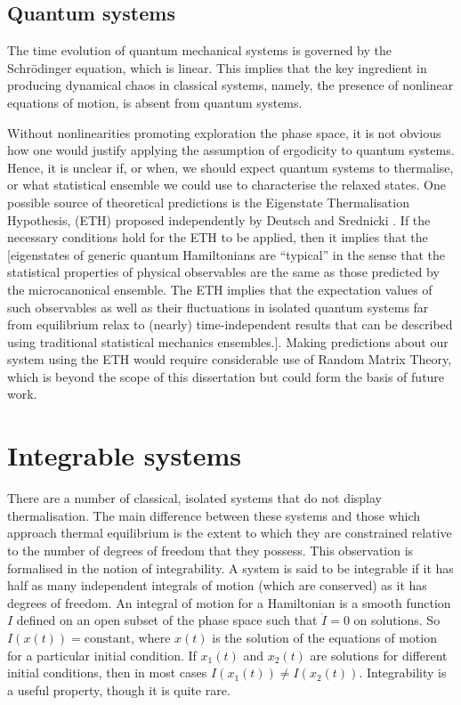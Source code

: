 \documentclass[a4paper, 10pt]{article}
\theoremstyle{plain}
\begin{document}
\subsection{Quantum systems}

The time evolution of quantum mechanical systems is governed by the
Schr\"odinger equation, which is linear. This implies that the key ingredient
in producing dynamical chaos in classical systems, namely, the presence of
nonlinear equations of motion, is absent from quantum systems.

Without nonlinearities promoting exploration the phase space, it is
not obvious how one would justify applying the assumption of ergodicity to
quantum systems. Hence, it is unclear if, or when, we should expect quantum systems to
thermalise, or what statistical ensemble we could use to characterise the
relaxed states. One possible source of theoretical predictions is the
Eigenstate Thermalisation Hypothesis, (ETH) proposed independently by Deutsch
\cite{Deutsch1991} and Srednicki \cite{Srednicki1994}. If the necessary
conditions hold for the ETH to be applied, then it implies that the [eigenstates
of generic quantum Hamiltonians are “typical” in the sense that the statistical
properties of physical observables are the same as those predicted by the
microcanonical ensemble. The ETH implies that the expectation values
of such observables as well as their fluctuations in isolated quantum systems
far from equilibrium relax to (nearly) time-independent results that can be
described using traditional statistical mechanics ensembles.]. Making predictions
about our system using the ETH would require considerable use of Random Matrix
Theory, which is beyond the scope of this dissertation but could form the basis
of future work.

\section{Integrable systems}

There are a number of classical, isolated systems that do not display
thermalisation. The main difference between these systems and those which
approach thermal equilibrium is the extent to which they are constrained
relative to the number of degrees of freedom that they possess. This observation
is formalised in the notion of integrability. A system is said to be integrable
if it has half as many independent integrals of motion (which are conserved)
as it has degrees of freedom. An integral of motion for a Hamiltonian is a
smooth function $I$ defined on an open subset of the phase space such that
$\dot{I}=0$ on solutions. So $I(x(t))=\text{constant}$, where $x(t)$ is the
solution of the equations of motion for a particular initial condition. If
$x_1(t)$ and $x_2(t)$ are solutions for different initial conditions, then in
most cases $I(x_1(t))\ne I(x_2(t))$. Integrability is a useful property, though
it is quite rare.
\end{document}

